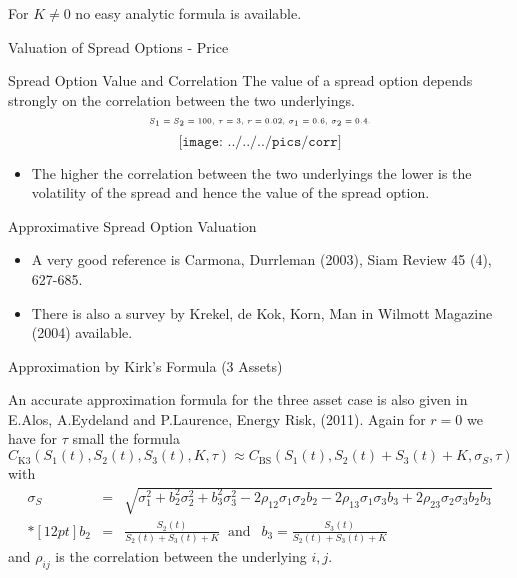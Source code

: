 For $K\neq 0$ no easy analytic formula is available.



{Valuation of Spread Options - Price}


{Spread Option Value and Correlation}
The value of a spread option depends strongly on the correlation between the two underlyings.
$$\tiny\text{$S_1=S_2=100$, $\tau=3$, $r=0.02$, $\sigma_1=0.6$, $\sigma_2=0.4$.}$$
\vspace{-0.76cm}
$$\texttt{[image: ../../../pics/corr]}$$
\begin{itemize}
\vspace{-1cm}
\item The higher the correlation between the two underlyings the lower is the volatility of the spread and hence the value of the spread option.
\end{itemize}



{Approximative Spread Option Valuation}
\begin{itemize}
\item<1-> A very good reference is Carmona, Durrleman (2003), Siam Review 45 (4), 627-685.
\item<2-> There is also a survey by Krekel, de Kok, Korn, Man in Wilmott Magazine (2004) available.
\end{itemize}



{Approximation by Kirk's Formula (3 Assets)}

An accurate approximation formula for the three asset case is also given in E.Alos, A.Eydeland and P.Laurence, Energy Risk, (2011). Again for $r=0$ we have for  $\tau$ small the formula
{\small
\begin{equation}
 C_{\mbox{K3}}(S_1(t), S_2(t), S_3(t), K, \tau) \approx
 C_{\mbox{BS}}(S_1(t), S_2(t)+S_3(t)+K, \sigma_S, \tau)
\label{kirk3}
\end{equation}
with
 $$
 \begin{array}{lll}
 \sigma_S & = & \sqrt{\sigma_1^2+b_2^2\sigma_2^2 +b_3^2\sigma_3^2
 - 2\rho_{12}\sigma_1\sigma_2b_2 - 2\rho_{13}\sigma_1\sigma_3b_3 + 2\rho_{23}\sigma_2\sigma_3b_2b_3}\\*[12pt]
 b_2 &=& \frac{S_2(t)}{S_2(t)+S_3(t)+ K}
 \;\;\mbox{and}  \;\;\
  b_3 = \frac{S_3(t)}{S_2(t)+S_3(t) + K}
\end{array}$$
}
and $\rho_{ij}$ is the correlation between the underlying $i,j$.





